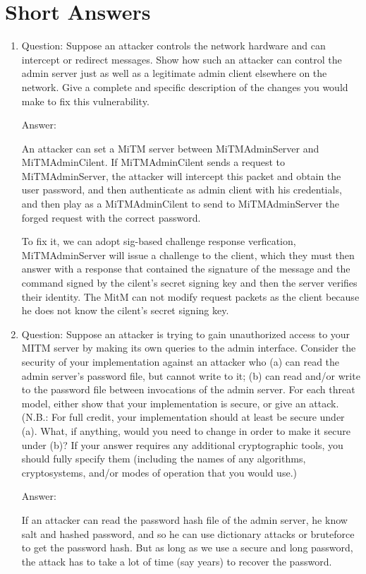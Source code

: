 \section{Short Answers}

\begin{enumerate}[(1)]
\item Question: Suppose an attacker controls the network hardware and can intercept or redirect
messages. Show how such an attacker can control the admin server just as well as 
a legitimate admin client elsewhere on the network. Give a complete and specific description of the changes you would make to fix this vulnerability.

Answer:

An attacker can set a MiTM server between MiTMAdminServer and MiTMAdminCilent. 
If MiTMAdminCilent sends a request to MiTMAdminServer, the attacker will intercept this packet and obtain the user password, and then authenticate as admin client with his credentials, and then play as a MiTMAdminCilent to send to MiTMAdminServer the forged request with the correct password.

To fix it, we can adopt sig-based challenge response verfication, 
MiTMAdminServer will issue a challenge to the client, which they must then answer with a response that contained the signature of the message and the command signed by the cilent's secret signing key and then the server verifies their identity.
The MitM can not modify request packets as the client because he does not know the cilent's secret signing key.

\item Question: Suppose an attacker is trying to gain unauthorized access to your MITM server
by making its own queries to the admin interface. Consider the security of your
implementation against an attacker who (a) can read the admin server's password
file, but cannot write to it; (b) can read and/or write to the password file between
invocations of the admin server. 
For each threat model, either show that your implementation is secure, or give an attack. (N.B.: For full credit, your implementation should at least be secure under (a). 
What, if anything, would you need to change in order to make it secure under (b)? If your answer requires any additional cryptographic tools, you should fully specify them (including the names of any algorithms,
cryptosystems, and/or modes of operation that you would use.)

Answer: 

If an attacker can read the password hash file of the admin server, he know salt and hashed password, and so he can use dictionary attacks or bruteforce to get the password hash. But as long as we use a secure  and long password, the attack has to take a lot of time (say years) to recover the password.


\end{enumerate}
